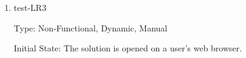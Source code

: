 \documentclass[12pt, titlepage]{article}
\begin{document}
\begin{enumerate}













  \item{test-LR3\\}

  Type: Non-Functional, Dynamic, Manual

  Initial State: The solution is opened on a user's web browser.


\end{enumerate}
\end{document}
